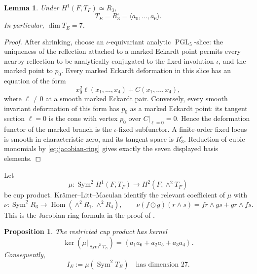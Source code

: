 \documentclass[11pt,reqno]{amsart}
\numberwithin{equation}{section}
\newtheorem{proposition}[theorem]{Proposition}
\newtheorem{lemma}[theorem]{Lemma}
\theoremstyle{definition}
\theoremstyle{remark}
\newcommand{\Sym}{\operatorname{Sym}}
\newcommand{\Hom}{\operatorname{Hom}}
\begin{document}
\begin{lemma}\label{lem:eckardt-tangent}
Under $H^1(F,T_F)\simeq R_3$,
\[
T_E=R_3^{\iota}=\langle a_0,\ldots,a_6\rangle.
\]
In particular, $\dim T_E=7$.
\end{lemma}

\begin{proof}
After shrinking, choose an $\iota$-equivariant analytic $\operatorname{PGL}_5$-slice: the uniqueness of the reflection attached to a marked Eckardt point permits every nearby reflection to be analytically conjugated to the fixed involution $\iota$, and the marked point to $p_0$.  Every marked Eckardt deformation in this slice has an equation of the form
\[
x_0^2\ell(x_1,\ldots,x_4)+C(x_1,\ldots,x_4),
\]
where $\ell\ne0$ at a smooth marked Eckardt pair.  Conversely, every smooth invariant deformation of this form has $p_0$ as a marked Eckardt point: its tangent section $\ell=0$ is the cone with vertex $p_0$ over $C|_{\ell=0}=0$.  Hence the deformation functor of the marked branch is the $\iota$-fixed subfunctor.  A finite-order fixed locus is smooth in characteristic zero, and its tangent space is $R_3^{\iota}$.  Reduction of cubic monomials by \eqref{eq:jacobian-ring} gives exactly the seven displayed basis elements.
\end{proof}

Let
\begin{equation}\label{eq:mu}
\mu:\Sym^2H^1(F,T_F)\longrightarrow H^2(F,\wedge^2T_F)
\end{equation}
be cup product.  Kr\"amer--Litt--Maculan identify the relevant coefficient of $\mu$ with
\begin{equation}\label{eq:nu}
\nu:\Sym^2R_3\longrightarrow
\Hom(\wedge^2R_1,\wedge^2R_4),
\qquad
\nu(f\odot g)(r\wedge s)=fr\wedge gs+gr\wedge fs.
\end{equation}
This is the Jacobian-ring formula in the proof of \cite[Proposition~3.8]{KLM2026}.

\begin{proposition}\label{prop:rank27}
The restricted cup product has kernel
\begin{equation}\label{eq:kernel-mu}
\ker(\mu|_{\Sym^2T_E})
=\left\langle a_1a_6+a_2a_5+a_3a_4\right\rangle.
\end{equation}
Consequently,
\[
I_E:=\mu(\Sym^2T_E)
\quad\text{has dimension }27.
\]
\end{proposition}
\end{document}
